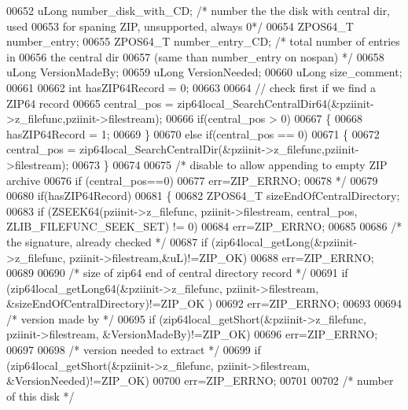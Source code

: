 \begin{DoxyCode}
00652   uLong number\_disk\_with\_CD;  \textcolor{comment}{/* number the the disk with central dir, used}
00653 \textcolor{comment}{                              for spaning ZIP, unsupported, always 0*/}
00654   ZPOS64\_T number\_entry;
00655   ZPOS64\_T number\_entry\_CD;      \textcolor{comment}{/* total number of entries in}
00656 \textcolor{comment}{                                the central dir}
00657 \textcolor{comment}{                                (same than number\_entry on nospan) */}
00658   uLong VersionMadeBy;
00659   uLong VersionNeeded;
00660   uLong size\_comment;
00661 
00662   \textcolor{keywordtype}{int} hasZIP64Record = 0;
00663 
00664   \textcolor{comment}{// check first if we find a ZIP64 record}
00665   central\_pos = zip64local\_SearchCentralDir64(&pziinit->z\_filefunc,pziinit->filestream);
00666   \textcolor{keywordflow}{if}(central\_pos > 0)
00667   \{
00668     hasZIP64Record = 1;
00669   \}
00670   \textcolor{keywordflow}{else} \textcolor{keywordflow}{if}(central\_pos == 0)
00671   \{
00672     central\_pos = zip64local\_SearchCentralDir(&pziinit->z\_filefunc,pziinit->filestream);
00673   \}
00674 
00675 \textcolor{comment}{/* disable to allow appending to empty ZIP archive}
00676 \textcolor{comment}{        if (central\_pos==0)}
00677 \textcolor{comment}{            err=ZIP\_ERRNO;}
00678 \textcolor{comment}{*/}
00679 
00680   \textcolor{keywordflow}{if}(hasZIP64Record)
00681   \{
00682     ZPOS64\_T sizeEndOfCentralDirectory;
00683     \textcolor{keywordflow}{if} (ZSEEK64(pziinit->z\_filefunc, pziinit->filestream, central\_pos, ZLIB\_FILEFUNC\_SEEK\_SET) != 0)
00684       err=ZIP\_ERRNO;
00685 
00686     \textcolor{comment}{/* the signature, already checked */}
00687     \textcolor{keywordflow}{if} (zip64local\_getLong(&pziinit->z\_filefunc, pziinit->filestream,&uL)!=ZIP\_OK)
00688       err=ZIP\_ERRNO;
00689 
00690     \textcolor{comment}{/* size of zip64 end of central directory record */}
00691     \textcolor{keywordflow}{if} (zip64local\_getLong64(&pziinit->z\_filefunc, pziinit->filestream, &sizeEndOfCentralDirectory)!=ZIP\_OK
      )
00692       err=ZIP\_ERRNO;
00693 
00694     \textcolor{comment}{/* version made by */}
00695     \textcolor{keywordflow}{if} (zip64local\_getShort(&pziinit->z\_filefunc, pziinit->filestream, &VersionMadeBy)!=ZIP\_OK)
00696       err=ZIP\_ERRNO;
00697 
00698     \textcolor{comment}{/* version needed to extract */}
00699     \textcolor{keywordflow}{if} (zip64local\_getShort(&pziinit->z\_filefunc, pziinit->filestream, &VersionNeeded)!=ZIP\_OK)
00700       err=ZIP\_ERRNO;
00701 
00702     \textcolor{comment}{/* number of this disk */}

\end{DoxyCode}
